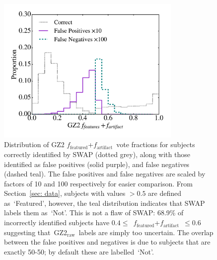 \documentclass[twocolumn]{aastex6}%
\newcommand{\feat}{`Featured'}
\newcommand{\notfeat}{`Not'}
\newcommand{\raw}{GZ2$_{\text{raw}}$}
\newcommand{\ffeat}{$f_{\mathrm{featured}}$}
\newcommand{\fstar}{$f_{\mathrm{artifact}}$}
\begin{document}

\begin{figure}[t!]
\includegraphics[width=3.5in]{f5.pdf}
\caption{Distribution of GZ2 \ffeat+\fstar~vote fractions for subjects correctly identified by SWAP (dotted grey), along with those identified as false positives (solid purple), and false negatives (dashed teal). 
The false positives and false negatives are scaled by factors of 10 and 100 respectively for easier comparison. From Section~\ref{sec: data}, subjects with values $> 0.5$ are defined as~\feat, however, the teal distribution indicates that SWAP labels them as~\notfeat. This is not a flaw of SWAP: 68.9\% of incorrectly identified subjects have $0.4 \le $~\ffeat +\fstar~$ \le 0.6$ suggesting that~\raw~labels are simply too uncertain. The overlap between the false positives and negatives is due to subjects that are exactly 50-50; by default these are labelled~\notfeat. \label{fig: SWAP sucks}}
\end{figure}
\end{document}
